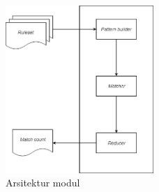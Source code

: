 \begin{figure}[htb]
  \centering
  \includegraphics[width=0.5\textwidth]{resources/module-arch.png}
  \caption[Arsitektur modul]{Arsitektur modul}
\end{figure}